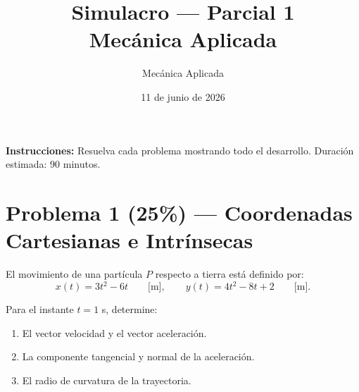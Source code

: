 \documentclass[12pt,a4paper]{article}
\title{Simulacro --- Parcial 1\\Mecánica Aplicada}
\author{Mecánica Aplicada}
\date{11 de junio de 2026}
\begin{document}
\maketitle

\begin{center}
\textbf{Instrucciones:} Resuelva cada problema mostrando todo el desarrollo.
Duración estimada: 90 minutos.
\end{center}

\vspace{1cm}

\section*{Problema 1 (25\%) --- Coordenadas Cartesianas e Intrínsecas}

El movimiento de una partícula $P$ respecto a tierra está definido por:
\[
x(t) = 3t^2 - 6t \qquad\text{[m]},\qquad
y(t) = 4t^2 - 8t + 2 \qquad\text{[m]}.
\]

Para el instante $t = 1$ s, determine:

\begin{enumerate}[label=\alph*)]
    \item El vector velocidad y el vector aceleración.
    \item La componente tangencial y normal de la aceleración.
    \item El radio de curvatura de la trayectoria.
\end{enumerate}

\vspace{0.5cm}
\end{document}
